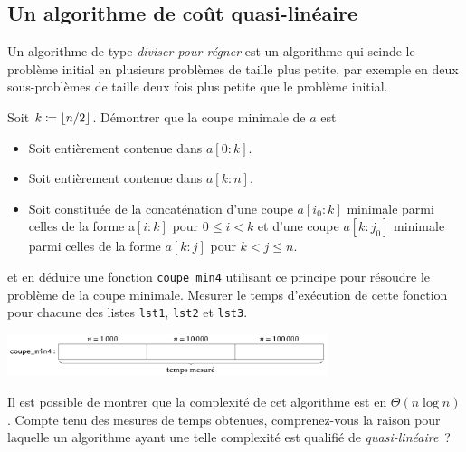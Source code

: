\documentclass{magnoliaold}
\begin{document}
\subsection{Un algorithme de coût quasi-linéaire}

Un algorithme de type \emph{diviser pour régner} est un algorithme qui scinde le problème initial en plusieurs
problèmes de taille plus petite, par exemple en deux sous-problèmes de taille deux fois plus petite que le
problème initial.

\begin{questions}
\question Soit $k\coloneqq\left\lfloor n/2\right\rfloor$. Démontrer que la coupe minimale de $a$ est
  \begin{itemize}
  \item Soit entièrement contenue dans $a[0:k]$.
  \item Soit entièrement contenue dans $a[k:n]$.
  \item Soit constituée de la concaténation d'une coupe $a[i_0:k]$ minimale parmi celles de la forme a$[i:k]$
    pour $0\leq i<k$ et d'une coupe $a[k:j_0]$ minimale parmi celles de la forme $a[k:j]$ pour $k<j\leq n$.
  \end{itemize}
  et en déduire une fonction \verb!coupe_min4! utilisant ce principe pour résoudre le problème de la coupe
  minimale.
\question Mesurer le temps d'exécution de cette fonction pour chacune des listes \verb!lst1!, \verb!lst2! et \verb!lst3!.
\begin{center}
  \includegraphics[width=0.7\textwidth]{../../commun/images/python-tp-coupe-4}
  \end{center}
\question Il est possible de montrer que la complexité de cet algorithme est en $\Theta(n \log n)$. Compte tenu des
  mesures de temps obtenues, comprenez-vous la raison pour laquelle un algorithme ayant une telle complexité est
  qualifié de \emph{quasi-linéaire}~?
\end{questions}
\end{document}
